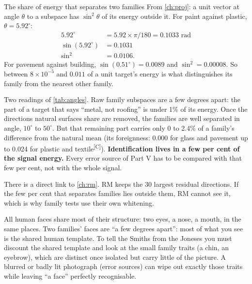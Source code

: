 \documentclass[11pt,a4paper,oneside,openany]{book}
\newcommand{\comp}{\textsuperscript{\textsf{\scriptsize[C]}}}
\begin{document}
\begin{worked}[label=we:sep]{The share of energy that separates two families}
From \cref{ch:proj}: a unit vector at angle $\theta$ to a subspace has $\sin^2\theta$ of its energy outside it. For paint against plastic,
$\theta=5.92^\circ$:
\begin{align*}
5.92^\circ &= 5.92\times\pi/180=0.1033\text{ rad}\\
\sin(5.92^\circ) &= 0.1031\\
\sin^2 &= 0.0106 .
\end{align*}
For pavement against building, $\sin(0.51^\circ)=0.0089$ and $\sin^2=0.00008$. So between $8\times10^{-5}$ and $0.011$ of a unit target's energy is what
distinguishes its family from the nearest other family.
\end{worked}

Two readings of \cref{tab:angles}. Raw family subspaces are a few degrees apart: the part of a target that says ``metal, not roofing'' is under 1\%
of its energy. Once the directions natural surfaces share are removed, the families are well separated in angle, $10^\circ$ to $50^\circ$. But that
remaining part carries only 0 to 2.4\% of a family's difference from the natural mean (its foreignness: 0.000 for glass and pavement up to 0.024
for plastic and textile\comp). \textbf{Identification lives in a few per cent of the signal energy.} Every error source of Part V has to be compared
with that few per cent, not with the whole signal.

There is a direct link to \cref{ch:rm}. RM keeps the 30 largest residual directions. If the few per cent that separates families lies outside
them, RM cannot see it, which is why family tests use their own whitening.

\begin{analogy}
All human faces share most of their structure: two eyes, a nose, a mouth, in the same places. Two families' faces are ``a few degrees apart'':
most of what you see is the shared human template. To tell the Smiths from the Joneses you must discount the shared template and look at the
small family traits (a chin, an eyebrow), which are distinct once isolated but carry little of the picture. A blurred or badly lit photograph
(error sources) can wipe out exactly those traits while leaving ``a face'' perfectly recognisable.
\end{analogy}
\end{document}
